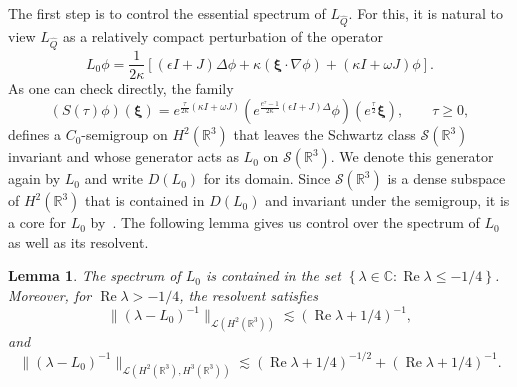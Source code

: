 \documentclass[11pt]{article}
\DeclareMathOperator{\real}{Re}
\newtheorem{lemma}[definition]{Lemma}
\begin{document}
The first step is to control the essential spectrum of
\(L_{\hat{Q}}\). For this, it is natural to view \(L_{\hat{Q}}\) as a
relatively compact perturbation of the operator
\begin{equation*}
  L_{0}\phi = \frac{1}{2\kappa}\left[
    (\epsilon I + J)\Delta\phi
    + \kappa(\bm{\xi} \cdot \nabla\phi)
    + (\kappa I + \omega J)\phi
  \right].
\end{equation*}
As one can check directly, the family
\begin{equation}\label{eq:L_0-semigroup}
  (S(\tau)\phi)(\bm{\xi})
  = e^{\frac{\tau}{2\kappa}(\kappa I + \omega J)}
  \left(e^{\frac{e^{\tau} - 1}{2\kappa}(\epsilon I + J)\Delta}\phi\right)\!\left(e^{\frac{\tau}{2}}\bm{\xi}\right),
  \qquad \tau \geq 0,
\end{equation}
defines a \(C_{0}\)-semigroup on \(H^{2}(\mathbb{R}^{3})\) that leaves
the Schwartz class \(\mathcal{S}(\mathbb{R}^{3})\) invariant and whose
generator acts as \(L_{0}\) on \(\mathcal{S}(\mathbb{R}^{3})\). We
denote this generator again by \(L_{0}\) and write \(D(L_{0})\) for
its domain. Since \(\mathcal{S}(\mathbb{R}^{3})\) is a dense subspace
of \(H^{2}(\mathbb{R}^{3})\) that is contained in \(D(L_{0})\) and
invariant under the semigroup, it is a core for \(L_{0}\)
by~\cite[Chapter~II, Proposition~1.7]{Engel2000}. The following lemma
gives us control over the spectrum of \(L_{0}\) as well as its
resolvent.

\begin{lemma}\label{lemma:L_0-spectrum}
  The spectrum of \(L_{0}\) is contained in the set
  \(\left\{\lambda \in \mathbb{C} \colon \real \lambda \leq
    -1/4\right\}\). Moreover, for \(\real \lambda > -1/4\), the
  resolvent satisfies
  \begin{equation}\label{eq:L_0-resolvent-bound}
    \|(\lambda - L_{0})^{-1}\|_{\mathcal{L}(H^{2}(\mathbb{R}^{3}))} \lesssim (\real \lambda + 1/4)^{-1},
  \end{equation}
  and
  \begin{equation}\label{eq:L_0-resolvent-smoothing}
    \|(\lambda - L_{0})^{-1}\|_{\mathcal{L}(H^{2}(\mathbb{R}^{3}), H^{3}(\mathbb{R}^{3}))}
    \lesssim (\real \lambda + 1/4)^{-1/2} + (\real \lambda + 1/4)^{-1}.
  \end{equation}
\end{lemma}
\end{document}
